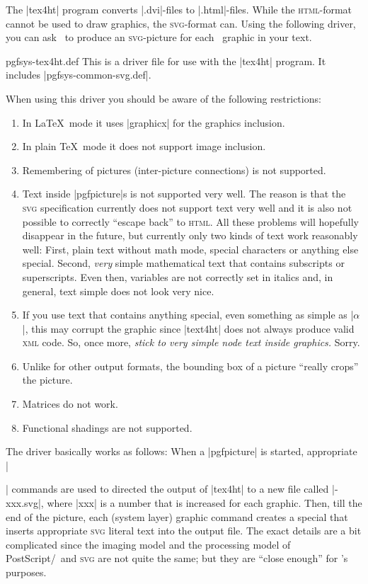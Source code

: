 The |tex4ht| program converts |.dvi|-files to |.html|-files. While the
\textsc{html}-format cannot be used to draw graphics, the
\textsc{svg}-format can. Using the following driver, you can ask
\pgfname\ to produce an \textsc{svg}-picture for each \pgfname\
graphic in your text.

\begin{filedescription}{pgfsys-tex4ht.def}
  This is a driver file for use with the |tex4ht| program. It includes
  |pgfsys-common-svg.def|.

  When using this driver you should be aware of the following
  restrictions: 
  \begin{enumerate}
  \item
    In \LaTeX\ mode it uses |graphicx| for the graphics
    inclusion.    
  \item
    In plain \TeX\ mode it does not support image inclusion.
  \item
    Remembering of pictures (inter-picture connections) is not
    supported. 
  \item
    Text inside |pgfpicture|s is not supported very well. The reason
    is that the \textsc{svg} specification currently does not support
    text very well and it is also not possible to correctly ``escape
    back'' to \textsc{html}. All these problems will hopefully
    disappear in the future, but currently only two kinds of text work
    reasonably well: First, plain text without math mode, special
    characters or anything else special. Second, \emph{very} simple
    mathematical text that contains subscripts or superscripts. Even
    then, variables are not correctly set in italics and, in general,
    text simple does not look very nice.
  \item
    If you use text that contains anything special, even something as
    simple as |$\alpha$|, this may corrupt the graphic since |text4ht|
    does not always produce valid \textsc{xml} code. So, once more,
    \emph{stick to very simple node text inside graphics.} Sorry.
  \item
    Unlike for other output formats, the bounding box of a picture
    ``really crops'' the picture.
  \item
    Matrices do not work.
  \item
    Functional shadings are not supported.
  \end{enumerate}

  The driver basically works as follows: When a |{pgfpicture}| is
  started, appropriate |\special| commands are used to directed the
  output of |tex4ht| to a new file called |\jobname-xxx.svg|, where
  |xxx| is a number that is increased for each graphic. Then, till the
  end of the picture, each (system layer) graphic command creates a
  special that inserts appropriate \textsc{svg} literal text into the
  output file. The exact details are a bit complicated since the
  imaging model and the processing model of PostScript/\pdf\ and
  \textsc{svg} are not quite the same; but they are ``close enough''
  for \pgfname's purposes.
\end{filedescription}


